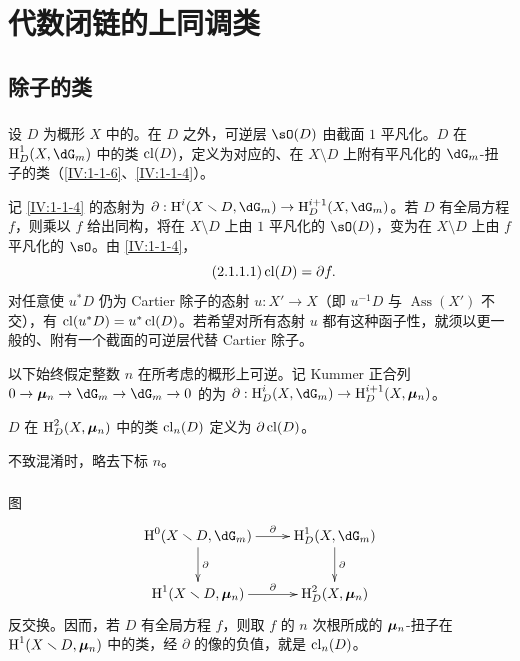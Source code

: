 \section{代数闭链的上同调类}\label{IV:2}
\subsection{除子的类}\label{IV:2-1}
\subsubsection{}\label{IV:2-1-1}
设 $D$ 为概形 $X$ 中的。在 $D$ 之外，可逆层 $\sO(D)$ 由截面 $1$ 平凡化。$D$ 在 $\h_D^1(X,\dG_m)$ 中的类 $\operatorname{cl}(D)$，定义为对应的、在 $X\setminus D$ 上附有平凡化的 $\dG_m$-扭子的类（\ref{IV:1-1-6}、\ref{IV:1-1-4}）。

记 \ref{IV:1-1-4} 的态射为 $\partial:\h^i(X\setminus D,\dG_m)\to\h_D^{i+1}(X,\dG_m)$。若 $D$ 有全局方程 $f$，则乘以 $f$ 给出同构，将在 $X\setminus D$ 上由 $1$ 平凡化的 $\sO(D)$，变为在 $X\setminus D$ 上由 $f$ 平凡化的 $\sO$。由 \ref{IV:1-1-4}，
\begin{equation*}\tag{2.1.1.1}\label{IV:eq:2-1-1}
\operatorname{cl}(D)=\partial f.
\end{equation*}
对任意使 $u^*D$ 仍为 Cartier 除子的态射 $u:X'\to X$（即 $u^{-1}D$ 与 $\operatorname{Ass}(X')$ 不交），有 $\operatorname{cl}(u^*D)=u^*\operatorname{cl}(D)$。若希望对所有态射 $u$ 都有这种函子性，就须以更一般的、附有一个截面的可逆层代替 Cartier 除子。

以下始终假定整数 $n$ 在所考虑的概形上可逆。记 Kummer 正合列 $0\to\dmu_n\to\dG_m\to\dG_m\to0$ 的为
$\partial:\h_D^i(X,\dG_m)\to\h_D^{i+1}(X,\dmu_n)$。

\begin{definition}\label{IV:2-1-2}
$D$ 在 $\operatorname{H}_D^2(X,{\bm\mu}_n)$ 中的类 $\operatorname{cl}_n(D)$ 定义为 $\partial\operatorname{cl}(D)$。
\end{definition}
不致混淆时，略去下标 $n$。

\subsubsection{}\label{IV:2-1-3}
图
\[\xymatrix{
\h^0(X\setminus D,\dG_m)\ar[r]^-\partial\ar[d]^-\partial&\h_D^1(X,\dG_m)\ar[d]^-\partial\\
\h^1(X\setminus D,\dmu_n)\ar[r]^-\partial&\h_D^2(X,\dmu_n)
}\]
反交换。因而，若 $D$ 有全局方程 $f$，则取 $f$ 的 $n$ 次根所成的 ${\bm\mu}_n$-扭子在 $\operatorname{H}^1(X\smallsetminus D,{\bm\mu}_n)$ 中的类，经 $\partial$ 的像的负值，就是 $\operatorname{cl}_n(D)$。

